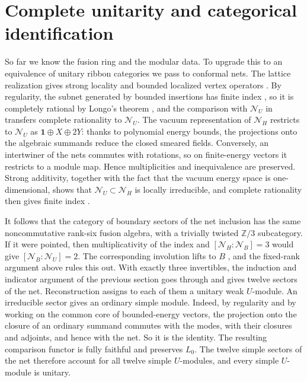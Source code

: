 \documentclass[11pt,a4paper]{article}
\newcommand{\one}{\mathbf1}
\newcommand{\ZZ}{\mathbb Z}
\begin{document}
\section{Complete unitarity and categorical identification}\label{sec:unitarity}
So far we know the fusion ring and the modular data. To upgrade this
to an equivalence of unitary ribbon categories we pass to conformal
nets. The lattice realization gives strong
locality and bounded localized vertex operators
\cite{CKLW,TenFields}. By regularity, the subnet generated by bounded
insertions has finite index \cite{TenFusion}, so it is completely
rational by Longo's theorem \cite{Longo}, and the comparison with
$\mathcal N_U$ in \cite[Lemma 7.6]{TenFields} transfers complete
rationality to $\mathcal N_U$. The vacuum representation of
$\mathcal N_H$ restricts to $\mathcal N_U$ as $\one\oplus X\oplus2Y$:
thanks to polynomial energy bounds, the projections onto the algebraic
summands reduce the closed smeared fields. Conversely, an intertwiner
of the nets commutes with rotations, so on finite-energy vectors it
restricts to a module map. Hence multiplicities and inequivalence are
preserved. Strong additivity, together with the fact that the vacuum
energy space is one-dimensional, shows that
$\mathcal N_U\subset\mathcal N_H$ is locally irreducible, and complete
rationality then gives finite index \cite[Proposition 2.3]{KL}.

It follows that the category of boundary sectors of the net inclusion
has the same noncommutative rank-six fusion algebra, with a trivially
twisted $\ZZ/3$ subcategory. If it were pointed, then multiplicativity
of the index and $[\mathcal N_H:\mathcal N_B]=3$ would give
$[\mathcal N_B:\mathcal N_U]=2$. The corresponding involution lifts to
$B$ \cite{CKLW}, and the fixed-rank argument above rules this out. With
exactly three invertibles, the induction and indicator argument of the
previous section goes through and gives twelve sectors of the net.
Reconstruction \cite[Theorem 9.5 and Remark 9.8]{HTNet} assigns to each of them a
unitary weak $U$-module. An irreducible sector gives an ordinary simple
module. Indeed, by regularity and by working on the common core of
bounded-energy vectors, the projection onto the closure of an ordinary
summand commutes with the modes, with their closures and adjoints, and
hence with the net. So it is the identity. The resulting comparison
functor is fully faithful and preserves $L_0$. The twelve simple
sectors of the net therefore account for all twelve simple
$U$-modules, and every simple $U$-module is unitary.
\end{document}
